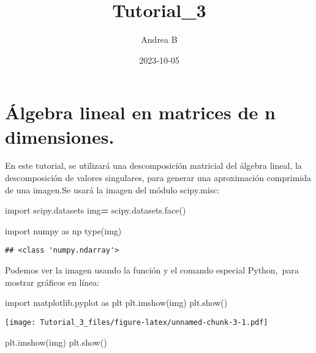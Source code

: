 \documentclass[
]{article}
\title{Tutorial\_3}
\author{Andrea B}
\date{2023-10-05}
\newenvironment{Shaded}{\begin{snugshade}}{\end{snugshade}}
\newcommand{\BuiltInTok}[1]{#1}
\newcommand{\ImportTok}[1]{#1}
\newcommand{\NormalTok}[1]{#1}
\newcommand{\OperatorTok}[1]{\textcolor[rgb]{0.81,0.36,0.00}{\textbf{#1}}}
\begin{document}
\maketitle

\hypertarget{uxe1lgebra-lineal-en-matrices-de-n-dimensiones.}{%
\section{\texorpdfstring{\textbf{Álgebra lineal en matrices de n
dimensiones.}}{Álgebra lineal en matrices de n dimensiones.}}\label{uxe1lgebra-lineal-en-matrices-de-n-dimensiones.}}

En este tutorial, se utilizará una descomposición matricial del álgebra
lineal, la descomposición de valores singulares, para generar una
aproximación comprimida de una imagen.Se usará la imagen del módulo
scipy.misc:

\begin{Shaded}
\begin{Highlighting}[]
\ImportTok{import}\NormalTok{ scipy.datasets}
\NormalTok{img}\OperatorTok{=}\NormalTok{ scipy.datasets.face()}
\end{Highlighting}
\end{Shaded}

\begin{Shaded}
\begin{Highlighting}[]
\ImportTok{import}\NormalTok{ numpy }\ImportTok{as}\NormalTok{ np}
\BuiltInTok{type}\NormalTok{(img)}
\end{Highlighting}
\end{Shaded}

\begin{verbatim}
## <class 'numpy.ndarray'>
\end{verbatim}

Podemos ver la imagen usando la función y el comando especial
Python,~para mostrar gráficos en línea:

\begin{Shaded}
\begin{Highlighting}[]
\ImportTok{import}\NormalTok{ matplotlib.pyplot }\ImportTok{as}\NormalTok{ plt}
\NormalTok{plt.imshow(img)}
\NormalTok{plt.show()}
\end{Highlighting}
\end{Shaded}

\texttt{[image: Tutorial\_3\_files/figure-latex/unnamed-chunk-3-1.pdf]}

\begin{Shaded}
\begin{Highlighting}[]
\NormalTok{plt.imshow(img)}
\NormalTok{plt.show()}
\end{Highlighting}
\end{Shaded}
\end{document}
